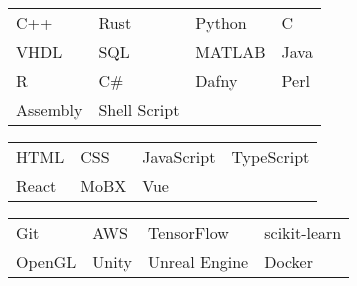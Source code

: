 \documentclass[paper=a4,fontsize=10pt]{resume}
\begin{document}
{	
		\begin{tabular}{llll}
			C++ & Rust & Python & C \\
			VHDL & SQL & MATLAB & Java \\
			R & C\# & Dafny & Perl \\
			Assembly & Shell Script
		\end{tabular}

		\medskip\normalsize

		\begin{tabular}{llll}
			HTML & CSS & JavaScript & TypeScript \\
			React & MoBX & Vue
		\end{tabular}

		\medskip\normalsize

		\begin{tabular}{llll}
			Git & AWS & TensorFlow & scikit-learn \\
			OpenGL & Unity & Unreal Engine & Docker
		\end{tabular}
}
\end{document}
